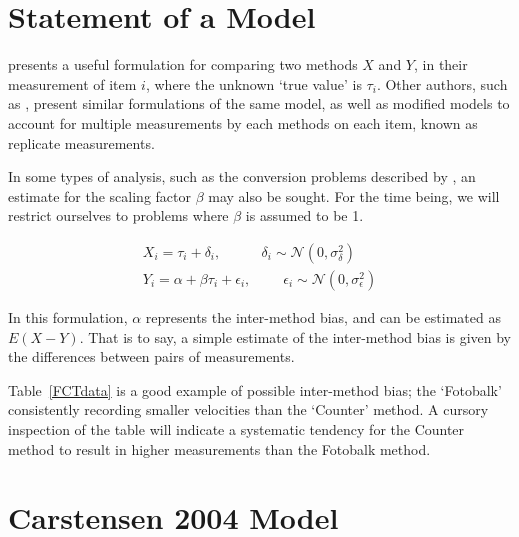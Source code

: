 \documentclass[12pt, a4paper]{report}
\theoremstyle{plain}
\theoremstyle{definition}
\theoremstyle{remark}
\begin{document}
	

	\section{Statement of a Model}
	\citet{BXC2010} presents a useful formulation for comparing two methods $X$ and $Y$, in their measurement of item $i$, where the unknown `true value' is $\tau_i$. Other authors, such as \citet{kinsella}, present similar formulations of the same model, as well as modified models to account for multiple measurements by each methods on each item, known as replicate measurements.
	
	In some types of analysis, such as the conversion problems described by \citet{lewis}, an estimate for 
	the scaling factor $\beta$ may also be sought. For the time being, we will restrict ourselves to problems where $\beta$ is assumed to be 1. 
	
	\begin{eqnarray}
	X_i = \tau_i + \delta_i , \phantom{spacin} \delta_i \sim \mathcal{N}(0,\sigma^2_\delta)\\
	Y_i = \alpha + \beta \tau_i + \epsilon_i, \phantom{spaci}  \epsilon_i \sim \mathcal{N}(0,\sigma^2_\epsilon)
	\end{eqnarray}
	
	In this formulation, $\alpha$ represents the inter-method bias, and can be estimated as $E(X-Y)$. That is to say, a simple estimate of the inter-method bias is given by the differences between pairs of measurements.  
	
	Table~\ref{FCTdata} is a good example of possible inter-method bias; the `Fotobalk' consistently recording
	smaller velocities than the `Counter' method. A cursory inspection of the table will indicate a systematic tendency for the Counter method to result in higher measurements than the Fotobalk method. %
	
	
\section{Carstensen 2004 Model}
\end{document}
